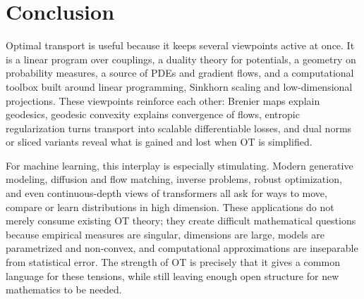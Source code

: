 \documentclass[10pt,a4paper,twoside,openany]{book}
\begin{document}
\tableofcontents

\mainmatter

















\chapter*{Conclusion}

Optimal transport is useful because it keeps several viewpoints active at once. It is a linear program over couplings, a duality theory for potentials, a geometry on probability measures, a source of PDEs and gradient flows, and a computational toolbox built around linear programming, Sinkhorn scaling and low-dimensional projections. These viewpoints reinforce each other: Brenier maps explain geodesics, geodesic convexity explains convergence of flows, entropic regularization turns transport into scalable differentiable losses, and dual norms or sliced variants reveal what is gained and lost when OT is simplified.

For machine learning, this interplay is especially stimulating. Modern generative modeling, diffusion and flow matching, inverse problems, robust optimization, and even continuous-depth views of transformers all ask for ways to move, compare or learn distributions in high dimension. These applications do not merely consume existing OT theory; they create difficult mathematical questions because empirical measures are singular, dimensions are large, models are parametrized and non-convex, and computational approximations are inseparable from statistical error. The strength of OT is precisely that it gives a common language for these tensions, while still leaving enough open structure for new mathematics to be needed.
\end{document}
